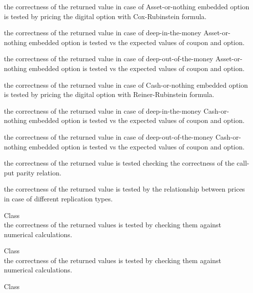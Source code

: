 \begin{DoxyRefList}
\begin{DoxyItemize}
\item the correctness of the returned value in case of Asset-\/or-\/nothing embedded option is tested by pricing the digital option with Cox-\/\+Rubinstein formula.
\item the correctness of the returned value in case of deep-\/in-\/the-\/money Asset-\/or-\/nothing embedded option is tested vs the expected values of coupon and option.
\item the correctness of the returned value in case of deep-\/out-\/of-\/the-\/money Asset-\/or-\/nothing embedded option is tested vs the expected values of coupon and option.
\item the correctness of the returned value in case of Cash-\/or-\/nothing embedded option is tested by pricing the digital option with Reiner-\/\+Rubinstein formula.
\item the correctness of the returned value in case of deep-\/in-\/the-\/money Cash-\/or-\/nothing embedded option is tested vs the expected values of coupon and option.
\item the correctness of the returned value in case of deep-\/out-\/of-\/the-\/money Cash-\/or-\/nothing embedded option is tested vs the expected values of coupon and option.
\item the correctness of the returned value is tested checking the correctness of the call-\/put parity relation.
\item the correctness of the returned value is tested by the relationship between prices in case of different replication types. 
\end{DoxyItemize}
\item[Class \doxylink{class_quant_lib_1_1_d_plus_d_minus}{Quant\+Lib\+::DPlus\+DMinus} ]\hfill \\
\label{test__test000081}%
%
the correctness of the returned values is tested by checking them against numerical calculations.  
\item[Class \doxylink{class_quant_lib_1_1_d_zero}{Quant\+Lib\+::DZero} ]\hfill \\
\label{test__test000082}%
%
the correctness of the returned values is tested by checking them against numerical calculations.  
\item[Class \doxylink{class_quant_lib_1_1_exchange_rate}{Quant\+Lib\+::Exchange\+Rate} ]\hfill \\
\label{test__test000003}%
%

\end{DoxyRefList}
